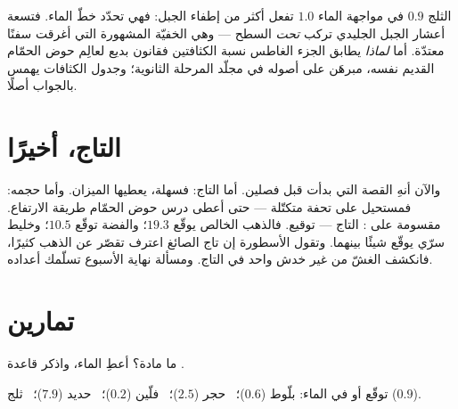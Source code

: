 \begin{remark}\label{rem:g6:density-floating:iceberg}
 الثلج $0.9$ في مواجهة  الماء $1.0$ تفعل أكثر من
إطفاء الجبل: فهي تحدّد خطّ الماء. فتسعة أعشار  الجبل
الجليدي تركب \emph{تحت} السطح --- وهي  الخفيّة المشهورة
التي أغرقت سفنًا معتدّة. أما \emph{لماذا} يطابق الجزء الغاطس
نسبة الكثافتين فقانون بديع لعالِم حوض الحمّام القديم نفسه،
مبرهَن على أصوله في مجلّد المرحلة الثانوية؛ وجدول الكثافات يهمس
بالجواب أصلًا.
\end{remark}

\section{التاج، أخيرًا}

\begin{example}\label{ex:g6:density-floating:crown}
والآن أنهِ القصة التي بدأت قبل فصلين. أما  التاج: فسهلة،
يعطيها الميزان. وأما حجمه: فمستحيل على تحفة متكتّلة --- حتى
أعطى درس حوض الحمّام طريقة الارتفاع.  مقسومة على :
\emph{} التاج ---  توقيع. فالذهب الخالص يوقّع
$19.3$؛ والفضة توقّع $10.5$؛ وخليط سرّي يوقّع شيئًا بينهما.
وتقول الأسطورة إن تاج الصائغ اعترف  تقصّر عن  الذهب
كثيرًا، فانكشف الغشّ من غير خدش واحد في التاج. ومسألة نهاية
الأسبوع تسلّمك أعداده.
\end{example}

\section{تمارين}

\begin{exercise}[$\star$]\label{exo:g6:density-floating:1}
ما  مادة؟ أعطِ  الماء، واذكر قاعدة .
\end{exercise}

\begin{exercise}[$\star$]\label{exo:g6:density-floating:2}
توقّع  أو  في الماء: بلّوط ($0.6$)؛ \ حجر ($2.5$)؛
\ فلّين ($0.2$)؛ \ حديد ($7.9$)؛ \ ثلج ($0.9$).
\end{exercise}

